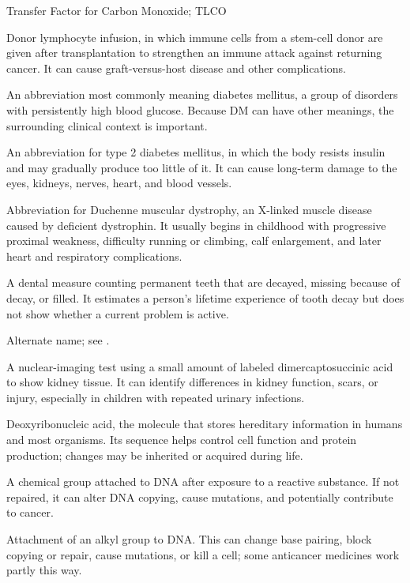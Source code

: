 \synonyms
Transfer Factor for Carbon Monoxide; TLCO

 Donor lymphocyte infusion, in which immune cells from a stem-cell donor are given after transplantation to strengthen an immune attack against returning cancer. It can cause graft-versus-host disease and other complications.

 An abbreviation most commonly meaning diabetes mellitus, a group of disorders with persistently high blood glucose. Because DM can have other meanings, the surrounding clinical context is important.

 An abbreviation for type 2 diabetes mellitus, in which the body resists insulin and may gradually produce too little of it. It can cause long-term damage to the eyes, kidneys, nerves, heart, and blood vessels.

 Abbreviation for Duchenne muscular dystrophy, an X-linked muscle disease caused by deficient dystrophin. It usually begins in childhood with progressive proximal weakness, difficulty running or climbing, calf enlargement, and later heart and respiratory complications.

 A dental measure counting permanent teeth that are decayed, missing because of decay, or filled. It estimates a person's lifetime experience of tooth decay but does not show whether a current problem is active.

 Alternate name; see .

 A nuclear-imaging test using a small amount of labeled dimercaptosuccinic acid to show kidney tissue. It can identify differences in kidney function, scars, or injury, especially in children with repeated urinary infections.

 Deoxyribonucleic acid, the molecule that stores hereditary information in humans and most organisms. Its sequence helps control cell function and protein production; changes may be inherited or acquired during life.

 A chemical group attached to DNA after exposure to a reactive substance. If not repaired, it can alter DNA copying, cause mutations, and potentially contribute to cancer.

 Attachment of an alkyl group to DNA. This can change base pairing, block copying or repair, cause mutations, or kill a cell; some anticancer medicines work partly this way.

